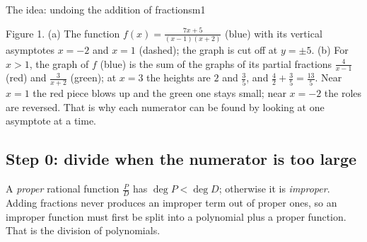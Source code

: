 \documentclass[11pt]{article}
\begin{document}
\begin{exmp}{The idea: undoing the addition of fractions}{m1}
\begin{center}
\end{center}
\begin{center}\small Figure 1. (a) The function $f(x)=\frac{7x+5}{(x-1)(x+2)}$ (blue) with its vertical asymptotes $x=-2$ and $x=1$ (dashed); the graph is cut off at $y=\pm5$. (b) For $x>1$, the graph of $f$ (blue) is the sum of the graphs of its partial fractions $\frac4{x-1}$ (red) and $\frac3{x+2}$ (green); at $x=3$ the heights are $2$ and $\frac35$, and $\frac42+\frac35=\frac{13}5$. Near $x=1$ the red piece blows up and the green one stays small; near $x=-2$ the roles are reversed. That is why each numerator can be found by looking at one asymptote at a time.\end{center}
\end{exmp}

\subsection*{Step 0: divide when the numerator is too large}

A \emph{proper} rational function $\frac PD$ has $\deg P<\deg D$; otherwise it is \emph{improper}. Adding fractions never produces an improper term out of proper ones, so an improper function must first be split into a polynomial plus a proper function. That is the division of polynomials.
\end{document}
